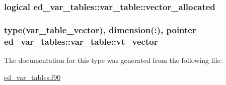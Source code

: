 \subsubsection[{\texorpdfstring{vector\+\_\+allocated}{vector_allocated}}]{\setlength{\rightskip}{0pt plus 5cm}logical ed\+\_\+var\+\_\+tables\+::var\+\_\+table\+::vector\+\_\+allocated}\hypertarget{structed__var__tables_1_1var__table_a41255913720040623a6bf9dd5b8267c5}{}\label{structed__var__tables_1_1var__table_a41255913720040623a6bf9dd5b8267c5}
\subsubsection[{\texorpdfstring{vt\+\_\+vector}{vt_vector}}]{\setlength{\rightskip}{0pt plus 5cm}type({\bf var\+\_\+table\+\_\+vector}), dimension(\+:), pointer ed\+\_\+var\+\_\+tables\+::var\+\_\+table\+::vt\+\_\+vector}\hypertarget{structed__var__tables_1_1var__table_a3eacba058cb9fcc8bef162cbcfb0d106}{}\label{structed__var__tables_1_1var__table_a3eacba058cb9fcc8bef162cbcfb0d106}


The documentation for this type was generated from the following file\+:\begin{DoxyCompactItemize}
\item 
\hyperlink{ed__var__tables_8f90}{ed\+\_\+var\+\_\+tables.\+f90}\end{DoxyCompactItemize}
